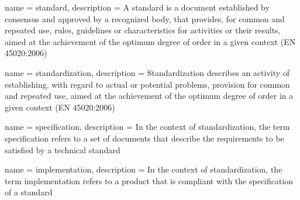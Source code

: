  { name = {standard},
  description = {A standard is a document established by consensus and
    approved by a recognized body, that provides, for common and
    repeated use, rules, guidelines or characteristics for activities
    or their results, aimed at the achievement of the optimum degree
    of order in a given context (EN 45020:2006)} }

 { name = {standardization},
  description = {Standardization describes an activity of
    establishing, with regard to actual or potential problems,
    provision for common and repeated use, aimed at the achievement of
    the optimum degree of order in a given context (EN 45020:2006)} }



 { name = {specification}, description = {In
    the context of \gls{standardization}, the term specification
    refers to a set of documents that describe the requirements to be
    satisfied by a technical standard} }

 { name = {implementation}, description = {In
    the context of \gls{standardization}, the term implementation
    refers to a product that is compliant with the specification of a
    standard} }
